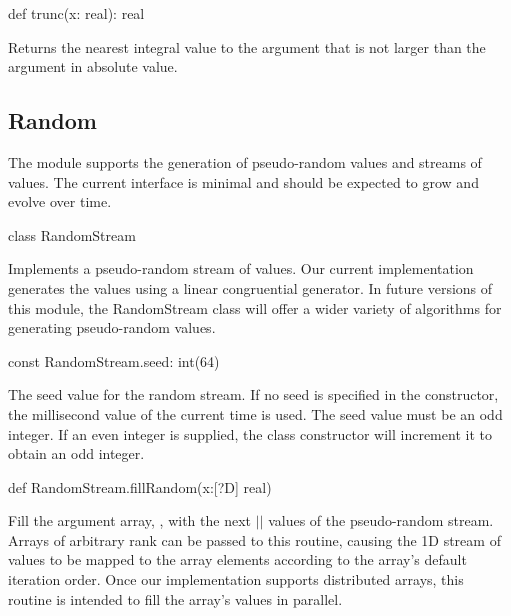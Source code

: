 \begin{protohead}
def trunc(x: real): real
\end{protohead}
\begin{protobody}
Returns the nearest integral value to the argument that is not larger
than the argument in absolute value.
\end{protobody}

\subsection{Random}
\label{Random}

The module  supports the generation of pseudo-random
values and streams of values.  The current interface is minimal and
should be expected to grow and evolve over time.

\begin{protohead}
class RandomStream
\end{protohead}
\begin{protobody}
Implements a pseudo-random stream of values.  Our current
implementation generates the values using a linear congruential
generator.  In future versions of this module, the RandomStream class
will offer a wider variety of algorithms for generating pseudo-random
values.
\end{protobody}

\begin{protohead}
const RandomStream.seed: int(64)
\end{protohead}
\begin{protobody}
The seed value for the random stream.  If no seed is specified in the
constructor, the millisecond value of the current time is used.  The
seed value must be an odd integer.  If an even integer is supplied,
the class constructor will increment it to obtain an odd integer.
\end{protobody}

\begin{protohead}
def RandomStream.fillRandom(x:[?D] real)
\end{protohead}
\begin{protobody}
Fill the argument array, , with the next $|$$|$ values
of the pseudo-random stream.  Arrays of arbitrary rank can be passed
to this routine, causing the 1D stream of values to be mapped to the
array elements according to the array's default iteration order.  Once
our implementation supports distributed arrays, this routine is
intended to fill the array's values in parallel.
\end{protobody}


